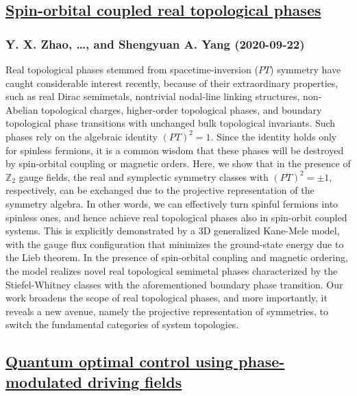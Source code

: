 {\subsection*{\href{http://arxiv.org/abs/2009.10287v1}{Spin-orbital coupled real topological phases}}
\subsubsection*{Y. X. Zhao, \dots, and Shengyuan A. Yang (2020-09-22)}
Real topological phases stemmed from spacetime-inversion ($PT$) symmetry have
caught considerable interest recently, because of their extraordinary
properties, such as real Dirac semimetals, nontrivial nodal-line linking
structures, non-Abelian topological charges, higher-order topological phases,
and boundary topological phase transitions with unchanged bulk topological
invariants. Such phases rely on the algebraic identity $(PT)^2=1$. Since the
identity holds only for spinless fermions, it is a common wisdom that these
phases will be destroyed by spin-orbital coupling or magnetic orders. Here, we
show that in the presence of $\mathbb{Z}_2$ gauge fields, the real and
symplectic symmetry classes with $(PT)^2=\pm 1$, respectively, can be exchanged
due to the projective representation of the symmetry algebra. In other words,
we can effectively turn spinful fermions into spinless ones, and hence achieve
real topological phases also in spin-orbit coupled systems. This is explicitly
demonstrated by a $3$D generalized Kane-Mele model, with the gauge flux
configuration that minimizes the ground-state energy due to the Lieb theorem.
In the presence of spin-orbital coupling and magnetic ordering, the model
realizes novel real topological semimetal phases characterized by the
Stiefel-Whitney classes with the aforementioned boundary phase transition. Our
work broadens the scope of real topological phases, and more importantly, it
reveals a new avenue, namely the projective representation of symmetries, to
switch the fundamental categories of system topologies.

\subsection*{\href{http://arxiv.org/abs/2009.10275v1}{Quantum optimal control using phase-modulated driving fields}}
}
